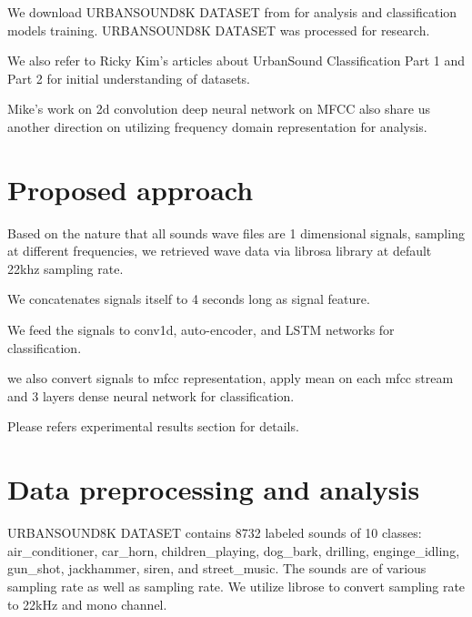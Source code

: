 \documentclass{article}
\begin{document}

We download URBANSOUND8K DATASET from \cite{URBANSOUND8K-DATASET} for analysis and classification models training. URBANSOUND8K DATASET was processed for \cite{Salamon:UrbanSound:ACMMM:14} research.


We also refer to Ricky Kim's articles about UrbanSound Classification Part 1 \cite{RickyKimUrbanSoundClassificationPart1soundwavedigitalaudiosignal} and Part 2 \cite{RickyKimUrbanSoundClassificationPart2samplerateconversionLibrosa} for initial understanding of datasets. 

Mike's work \cite{MikeSmalesSoundClassificationusingDeepLearning} on 2d convolution deep neural network on MFCC also share us another direction on utilizing frequency domain representation for analysis. 


\section{Proposed approach}
\label{sec:proposed approach}
Based on the nature that all sounds wave files are 1 dimensional signals, sampling at different frequencies, we retrieved wave data via librosa library at default 22khz sampling rate.

We concatenates signals itself to 4 seconds long as signal feature.

We feed the signals to conv1d, auto-encoder, and LSTM networks for classification.

we also convert signals to mfcc representation, apply mean on each mfcc stream and 3 layers dense neural network for classification.

Please refers experimental results section for details.


\label{sec:experimental results}
\section{Data preprocessing and analysis}
URBANSOUND8K DATASET\cite{URBANSOUND8K-DATASET} contains 8732 labeled sounds of 10 classes:
air\_conditioner, car\_horn, children\_playing, dog\_bark, drilling, enginge\_idling, gun\_shot, jackhammer, siren, and street\_music.
The sounds are of various sampling rate as well as sampling rate. We utilize librose to convert sampling rate to 22kHz and mono channel. 
\end{document}
